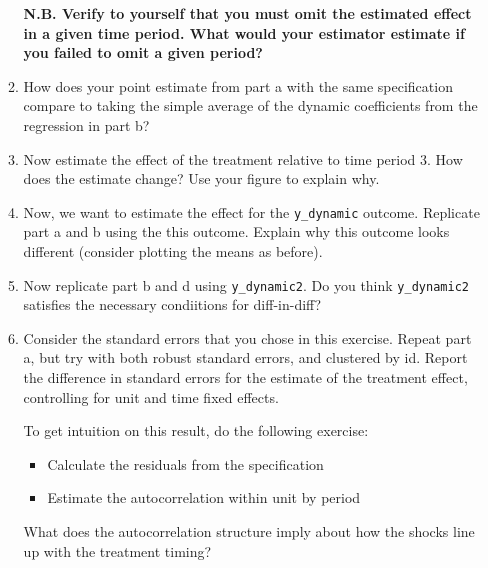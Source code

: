 \documentclass[11pt, a4paper]{article}
\begin{document}
\begin{enumerate}
\begin{enumerate}
    \textbf{N.B. Verify to yourself that you must omit the estimated
      effect in a given time period.  What would your estimator
      estimate if you failed to omit a given period?}
  \item How does your point estimate from part a with the same
    specification compare to taking the simple average of the dynamic
    coefficients from the regression in part b? 
  \item Now estimate the effect of the treatment relative to time
    period 3. How does the estimate change? Use your figure to explain why.
  \item Now, we want to estimate the effect for the \texttt{y\_dynamic}
    outcome. Replicate part a and b using the this outcome. Explain
    why this outcome looks different (consider plotting the means as
    before).
  \item Now replicate part b and d using \texttt{y\_dynamic2}. Do you
    think \texttt{y\_dynamic2} satisfies the necessary condiitions for
    diff-in-diff?
  \item Consider the standard errors that you chose in this
    exercise. Repeat part a, but try with both robust standard errors,
    and clustered by id. Report the difference in standard errors for
    the estimate of the treatment effect, controlling for unit and
    time fixed effects.

    To get intuition on this result, do the following exercise:

    \begin{itemize}
    \item Calculate the residuals from the specification
    \item Estimate the autocorrelation within unit by period
    \end{itemize}
    What does the autocorrelation structure imply about how the shocks
    line up with the treatment timing?
  \end{enumerate}
  

\end{enumerate}
\end{document}
